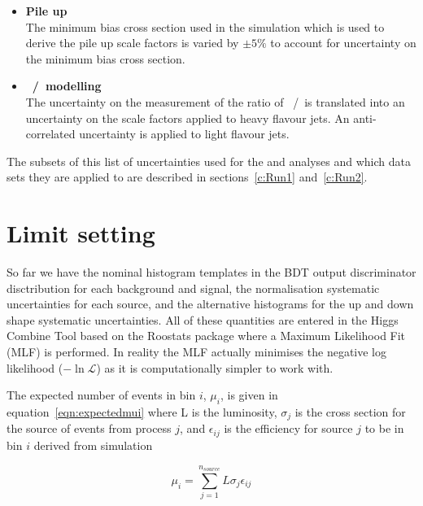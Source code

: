 \begin{itemize}
\item \textbf{Pile up}\\
The minimum bias cross section used in the simulation which is used to derive the pile up scale factors is varied by $\pm 5\%$ to account for uncertainty on the minimum bias cross section. 

\item \textbf{\heavyflavourone~/~\heavyflavourtwo modelling}\\
The uncertainty on the measurement of the ratio of \heavyflavourone~/~\heavyflavourtwo is translated into an uncertainty on the scale factors applied to heavy flavour jets. An anti-correlated uncertainty is applied to light flavour jets.

\end{itemize}

The subsets of this list of uncertainties used for the \runone and \runtwo analyses and which data sets they are applied to are described in sections~\ref{c:Run1} and~\ref{c:Run2}. 


\section{Limit setting \label{sec:limitFit}}
So far we have the nominal histogram templates in the BDT output discriminator disctribution for each background and signal, the normalisation systematic uncertainties for each source, and the alternative histograms for the up and down shape systematic uncertainties. All of these quantities are entered in the Higgs Combine Tool based on the Roostats package where a Maximum Likelihood Fit (MLF) is performed. In reality the MLF actually minimises the negative log likelihood ($-\ln\mathcal{L}$) as it is computationally simpler to work with.

The expected number of events in bin $i$, $\mu_{i}$, is given in equation~\ref{eqn:expectedmui} where L is the luminosity, $\sigma_{j}$ is the cross section for the source of events from process $j$, and $\epsilon_{ij}$ is the efficiency for source $j$ to be in bin $i$ derived from simulation

\begin{equation}
\mu_{i} = \sum_{j=1}^{n_{source}}L\sigma_{j}\epsilon_{ij}
\label{eqn:expectedmui}
\end{equation}

